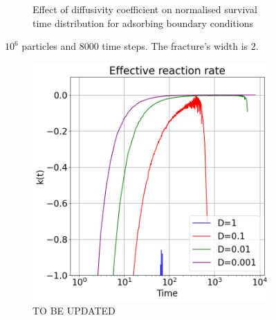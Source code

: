 \documentclass{article}
\begin{document}
\begin{figure}[htbp]
\begin{subfigure}[b]{0.45\textwidth}
        \caption{Effect of diffusivity coefficient on normalised survival time distribution for adsorbing boundary conditions}
    \end{subfigure}
    \caption{$10^6$ particles and 8000 time steps. The fracture's width is 2.}
    \label{fig:survTimeDiff}
\end{figure}

\begin{figure}[htbp]
    \centering
    \begin{subfigure}[b]{0.45\textwidth}
        \centering
        \includegraphics[width=\textwidth]{images/compareAdsRatesDiff.png}
        \caption{TO BE UPDATED}
    \end{subfigure}
    \hfill
    \begin{subfigure}[b]{0.45\textwidth}
        \centering

\end{subfigure}
\end{figure}
\end{document}
